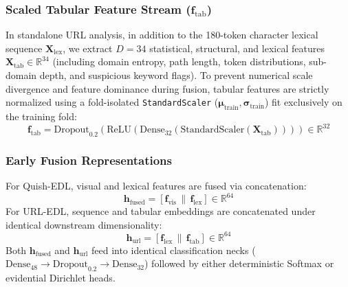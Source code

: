 \documentclass[conference]{IEEEtran}
\begin{document}
\subsubsection{Scaled Tabular Feature Stream ($\mathbf{f}_{\text{tab}}$)}
In standalone URL analysis, in addition to the 180-token character lexical sequence $\mathbf{X}_{\text{lex}}$, we extract $D=34$ statistical, structural, and lexical features $\mathbf{X}_{\text{tab}} \in \mathbb{R}^{34}$ (including domain entropy, path length, token distributions, sub-domain depth, and suspicious keyword flags). To prevent numerical scale divergence and feature dominance during fusion, tabular features are strictly normalized using a fold-isolated \texttt{StandardScaler} ($\boldsymbol{\mu}_{\text{train}}, \boldsymbol{\sigma}_{\text{train}}$) fit exclusively on the training fold:
\begin{equation}
\mathbf{f}_{\text{tab}} = \text{Dropout}_{0.2}(\text{ReLU}(\text{Dense}_{32}(\text{StandardScaler}(\mathbf{X}_{\text{tab}})))) \in \mathbb{R}^{32}
\end{equation}

\subsubsection{Early Fusion Representations}
For Quish-EDL, visual and lexical features are fused via concatenation:
\begin{equation}
\mathbf{h}_{\text{fused}} = [\mathbf{f}_{\text{vis}} \,\|\, \mathbf{f}_{\text{lex}}] \in \mathbb{R}^{64}
\end{equation}
For URL-EDL, sequence and tabular embeddings are concatenated under identical downstream dimensionality:
\begin{equation}
\mathbf{h}_{\text{url}} = [\mathbf{f}_{\text{lex}} \,\|\, \mathbf{f}_{\text{tab}}] \in \mathbb{R}^{64}
\end{equation}
Both $\mathbf{h}_{\text{fused}}$ and $\mathbf{h}_{\text{url}}$ feed into identical classification necks ($\text{Dense}_{48} \to \text{Dropout}_{0.2} \to \text{Dense}_{32}$) followed by either deterministic Softmax or evidential Dirichlet heads.
\end{document}
